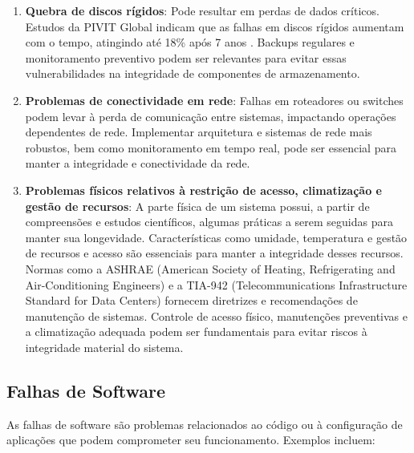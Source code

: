 \documentclass[12pt,oneside,a4paper,article]{abntex2}
\begin{document}
\begin{enumerate}
    \item \textbf{Quebra de discos rígidos}: Pode resultar em perdas de dados críticos. Estudos da PIVIT Global indicam que as falhas em discos rígidos aumentam com o tempo, atingindo até 18\% após 7 anos \cite{pivitglobal}. Backups regulares e monitoramento preventivo podem ser relevantes para evitar essas vulnerabilidades na integridade de componentes de armazenamento.
    
    \item \textbf{Problemas de conectividade em rede}: Falhas em roteadores ou switches podem levar à perda de comunicação entre sistemas, impactando operações dependentes de rede. Implementar arquitetura e sistemas de rede mais robustos, bem como monitoramento em tempo real, pode ser essencial para manter a integridade e conectividade da rede.
    
    \item \textbf{Problemas físicos relativos à restrição de acesso, climatização e gestão de recursos}: A parte física de um sistema possui, a partir de compreensões e estudos científicos, algumas práticas a serem seguidas para manter sua longevidade. Características como umidade, temperatura e gestão de recursos e acesso são essenciais para manter a integridade desses recursos. Normas como a ASHRAE (American Society of Heating, Refrigerating and Air-Conditioning Engineers) e a TIA-942 (Telecommunications Infrastructure Standard for Data Centers) fornecem diretrizes e recomendações de manutenção de sistemas. Controle de acesso físico, manutenções preventivas e a climatização adequada podem ser fundamentais para evitar riscos à integridade material do sistema.
\end{enumerate}

\subsection{Falhas de Software}

As falhas de software são problemas relacionados ao código ou à configuração de aplicações que podem comprometer seu funcionamento. Exemplos incluem:
\end{document}
